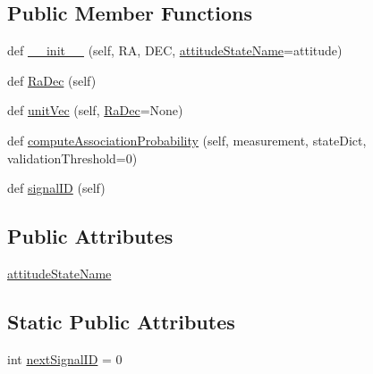 \subsection*{Public Member Functions}
\begin{DoxyCompactItemize}
\item 
def \hyperlink{classmodest_1_1signals_1_1pointsource_1_1PointSource_a32143ad5b008b5e763fb2bb4cd984924}{\+\_\+\+\_\+init\+\_\+\+\_\+} (self, RA, D\+EC, \hyperlink{classmodest_1_1signals_1_1pointsource_1_1PointSource_a0924a2233bb4fd23e50d024e4f1b048e}{attitude\+State\+Name}=\textquotesingle{}attitude\textquotesingle{})
\item 
def \hyperlink{classmodest_1_1signals_1_1pointsource_1_1PointSource_a295eb1a487e18c77029585ac2785db80}{Ra\+Dec} (self)
\item 
def \hyperlink{classmodest_1_1signals_1_1pointsource_1_1PointSource_a133933430a784107258901e257778221}{unit\+Vec} (self, \hyperlink{classmodest_1_1signals_1_1pointsource_1_1PointSource_a295eb1a487e18c77029585ac2785db80}{Ra\+Dec}=None)
\item 
def \hyperlink{classmodest_1_1signals_1_1pointsource_1_1PointSource_a8bdf640e312bbf3a56efd0e89d496361}{compute\+Association\+Probability} (self, measurement, state\+Dict, validation\+Threshold=0)
\item 
def \hyperlink{classmodest_1_1signals_1_1signalsource_1_1SignalSource_a9a64c6a9c2954f6ad61e4ca3518ea8ab}{signal\+ID} (self)
\end{DoxyCompactItemize}
\subsection*{Public Attributes}
\begin{DoxyCompactItemize}
\item 
\hyperlink{classmodest_1_1signals_1_1pointsource_1_1PointSource_a0924a2233bb4fd23e50d024e4f1b048e}{attitude\+State\+Name}
\end{DoxyCompactItemize}
\subsection*{Static Public Attributes}
\begin{DoxyCompactItemize}
\item 
int \hyperlink{classmodest_1_1signals_1_1signalsource_1_1SignalSource_a453eafb550b551adbec0903deb63dfce}{next\+Signal\+ID} = 0
\end{DoxyCompactItemize}
